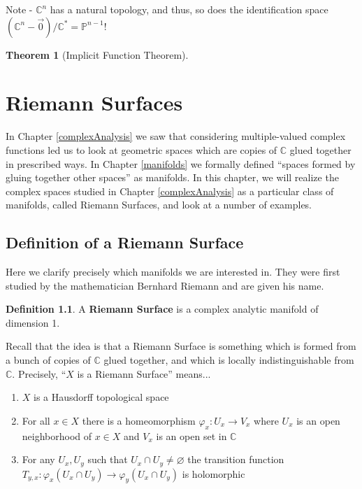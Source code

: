 \documentclass[12pt]{book}%
\theoremstyle{plain}
\newtheorem{theorem}{Theorem}[section]
\theoremstyle{definition}
\newtheorem{definition}[theorem]{Definition}
\theoremstyle{remark}
\def\to{\rightarrow}
\def\bC{{\mathbb{C}}}
\def\bP{{\mathbb{P}}}
\begin{document}
Note - $\bC^n$ has a natural topology, and thus, so does the identification space $(\bC^n-\vec{0})/\bC^* = \bP^{n-1}$!

\begin{theorem}[Implicit Function Theorem]
\label{implicitFunctionTheorem}

\end{theorem}


\chapter{Riemann Surfaces}
\label{riemannSurfaces}



In Chapter \ref{complexAnalysis} we saw that considering multiple-valued complex functions led us to look at geometric spaces which are copies of $\bC$ glued together in prescribed ways. In Chapter \ref{manifolds} we formally defined ``spaces formed by gluing together other spaces'' as manifolds. In this chapter, we will realize the complex spaces studied in Chapter \ref{complexAnalysis} as a particular class of manifolds, called Riemann Surfaces, and look at a number of examples.


\section{Definition of a Riemann Surface}

Here we clarify precisely which manifolds we are interested in. They were first studied by the mathematician Bernhard Riemann and are given his name.

\begin{definition}
A \textbf{Riemann Surface} is a complex analytic manifold of dimension 1.
\end{definition}

Recall that the idea is that a Riemann Surface is something which is formed from a bunch of copies of $\bC$ glued together, and which is locally indistinguishable from $\bC$. Precisely, ``$X$ is a Riemann Surface'' means...

\begin{enumerate}
\item $X$ is a Hausdorff topological space
\label{hausdorffCondition}

\item For all $x \in X$ there is a homeomorphism $\varphi_x:U_x \to V_x$ where $U_x$ is an open neighborhood of $x \in X$ and $V_x$ is an open set in $\bC$
\label{localCharts}


\item For any $U_x,U_y$ such that $U_x \cap U_y \neq \varnothing$ the transition function $T_{y,x}:\varphi_x(U_x \cap U_y) \to \varphi_y(U_x \cap U_y)$ is holomorphic
\label{transitionFunctions}
\end{enumerate}
\end{document}
